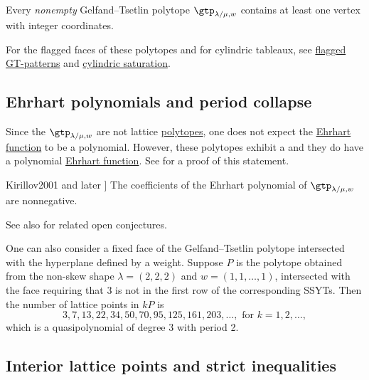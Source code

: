 \begin{theorem}

Every \emph{nonempty} Gelfand--Tsetlin polytope $\gtp_{\lambda/\mu,w}$
contains at least one vertex with integer coordinates.

\end{theorem}

For the flagged faces of these polytopes and for cylindric tableaux, see
\hyperref[flaggedGTLexMinVertex]{flagged GT-patterns} and
\hyperref[cylindricKostkaSaturation]{cylindric saturation}.



\subsection[gtKostkaEhrhart]{Ehrhart polynomials and period collapse}

Since the $\gtp_{\lambda/\mu,w}$ are not lattice \hyperref[polytope]{polytopes},
one does not expect the \hyperref[ehrhart]{Ehrhart function} to be a polynomial.
However, these polytopes exhibit a \label{periodCollapse}
\cite{HaaseMcAllister2007}
and they do have a polynomial \hyperref[ehrhart]{Ehrhart function}.
See \cite{Rassart2004} for a proof of this statement.


\begin{conjecture}[See \cite[p.~170]{Kirillov2001} and later \cite{KingTolluToumazet2004}]
The coefficients of the Ehrhart polynomial of $\gtp_{\lambda/\mu,w}$ are
nonnegative.
\end{conjecture}

See also \cite{Alexandersson2015KSaturation} for related open conjectures.


One can also consider a fixed face of the Gelfand--Tsetlin polytope intersected
with the hyperplane defined by a weight.
Suppose $P$ is the polytope obtained from the non-skew shape $\lambda = (2,2,2)$
and $w = (1,1,\dotsc,1)$, intersected with the face requiring
that $3$ is not in the first row of the corresponding SSYTs.
Then the number of lattice points in $kP$ is
\[
  3, 7, 13, 22, 34, 50, 70, 95, 125, 161, 203, \dotsc,
  \text{ for } k=1,2,\dotsc,
\]
which is a quasipolynomial of degree 3 with period 2.





\subsection[gtKostkaInterior]{Interior lattice points and strict inequalities}


